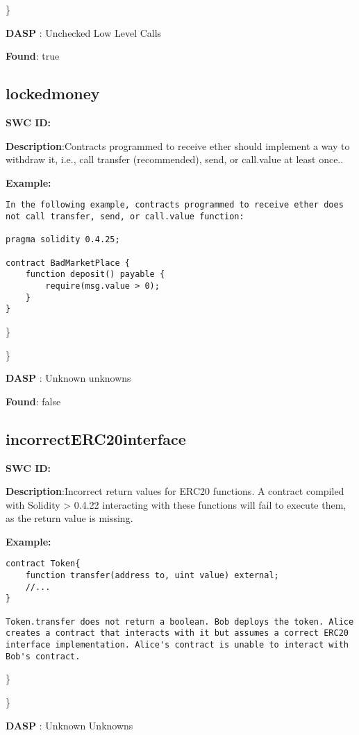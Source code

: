 \documentclass{article}
\begin{document}
\} 

\textbf{DASP} : Unchecked Low Level Calls

\textbf{Found}: true

\subsection{locked\textunderscore money} 
\textbf{SWC \textunderscore ID:} 

\textbf{Description}:Contracts programmed to receive ether should implement a way to withdraw it, i.e., call transfer (recommended), send, or call.value at least once..


\textbf{Example:} 
\begin{verbatim}
In the following example, contracts programmed to receive ether does not call transfer, send, or call.value function:

pragma solidity 0.4.25;

contract BadMarketPlace {
    function deposit() payable {
        require(msg.value > 0);
    }
}

\end{verbatim}\} 

\} 

\textbf{DASP} : Unknown unknowns

\textbf{Found}: false

\subsection{incorrect\textunderscore ERC20\textunderscore interface} 
\textbf{SWC \textunderscore ID:} 

\textbf{Description}:Incorrect return values for ERC20 functions. A contract compiled with Solidity > 0.4.22 interacting with these functions will fail to execute them, as the return value is missing.


\textbf{Example:} 
\begin{verbatim}
contract Token{
    function transfer(address to, uint value) external;
    //...
}

Token.transfer does not return a boolean. Bob deploys the token. Alice creates a contract that interacts with it but assumes a correct ERC20 interface implementation. Alice's contract is unable to interact with Bob's contract.

\end{verbatim}\} 

\} 

\textbf{DASP} : Unknown Unknowns
\end{document}
